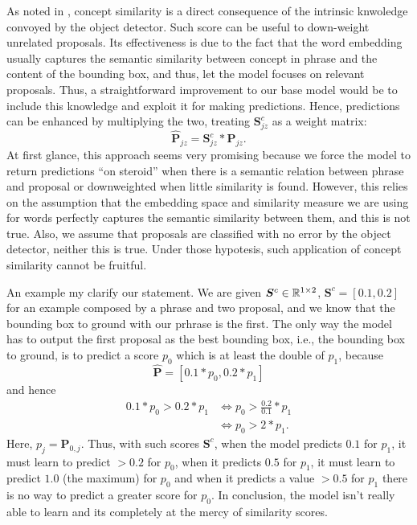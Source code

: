 As noted in \cite{chen2018knowledge}, concept similarity is a direct
consequence of the intrinsic knwoledge convoyed by the object
detector. Such score can be useful to down-weight unrelated proposals.
Its effectiveness is due to the fact that the word embedding usually
captures the semantic similarity between concept in phrase and the
content of the bounding box, and thus, let the model focuses on
relevant proposals. Thus, a straightforward improvement to our base
model would be to include this knowledge and exploit it for making
predictions. Hence, predictions can be enhanced by multiplying the
two, treating $\bm{S}^c_{jz}$ as a weight matrix:
\begin{equation}
  \bm{\hat{P}}_{jz} = \bm{S}^c_{jz} * \bm{P}_{jz}.
\end{equation}
At first glance, this approach seems very promising because we force
the model to return predictions ``on steroid'' when there is a
semantic relation between phrase and proposal or downweighted when
little similarity is found. However, this relies on the assumption
that the embedding space and similarity measure we are using for words
perfectly captures the semantic similarity between them, and this is
not true. Also, we assume that proposals are classified with no error
by the object detector, neither this is true. Under those hypotesis,
such application of concept similarity cannot be fruitful. 

An example my clarify our statement. We are given $\bm{S}^c \in
\mathbb{R}^{1 \times 2}$, $\bm{S}^c = [0.1, 0.2]$ for an example composed by a
phrase and two proposal, and we know that the bounding box to ground
with our prhrase is the first. The only way the model has to output
the first proposal as the best bounding box, i.e., the bounding box to
ground, is to predict a score $p_{0}$ which is at least the double of
$p_{1}$, because
\begin{equation}
  \bm{\hat{P}} = [0.1 * p_{0}, 0.2 * p_{1}]
\end{equation}
and hence
\begin{equation}
\begin{split}
0.1 * p_{0} > 0.2 * p_{1} & \iff p_{0} >  \frac{0.2}{0.1} * p_{1} \\
  & \iff p_{0} > 2 * p_{1}.
\end{split}
\end{equation}
Here, $p_{j} = \bm{P}_{0,j}$. Thus, with such scores $\bm{S}^c$, when
the model predicts $0.1$ for $p_1$, it must learn to predict $> 0.2$
for $p_0$, when it predicts $0.5$ for $p_1$, it must learn to predict
$1.0$ (the maximum) for $p_0$ and when it predicts a value $> 0.5$ for
$p_1$ there is no way to predict a greater score for $p_0$. In
conclusion, the model isn't really able to learn and its completely at
the mercy of similarity scores.

